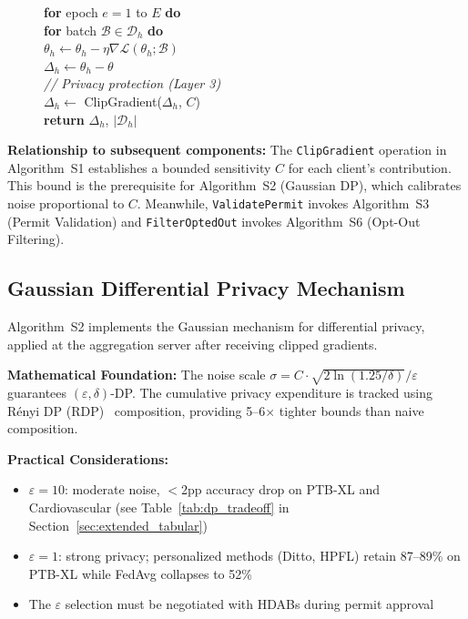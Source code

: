 \documentclass[conference]{IEEEtran}
\begin{document}
\begin{figure}[htbp]
{{\hspace*{4mm}\textbf{for} epoch $e = 1$ to $E$ \textbf{do}\\
\hspace*{8mm}\textbf{for} batch $\mathcal{B} \in \mathcal{D}_h$ \textbf{do}\\
\hspace*{12mm}$\theta_h \leftarrow \theta_h - \eta \nabla \mathcal{L}(\theta_h; \mathcal{B})$\\
\hspace*{4mm}$\Delta_h \leftarrow \theta_h - \theta$\\
\hspace*{4mm}\textit{// Privacy protection (Layer 3)}\\
\hspace*{4mm}$\Delta_h \leftarrow$ ClipGradient($\Delta_h$, $C$)\\
\hspace*{4mm}\textbf{return} $\Delta_h$, $|\mathcal{D}_h|$
}}
\end{figure}

\textbf{Relationship to subsequent components:} The \texttt{ClipGradient} operation in Algorithm~S1 establishes a bounded sensitivity $C$ for each client's contribution. This bound is the prerequisite for Algorithm~S2 (Gaussian DP), which calibrates noise proportional to $C$. Meanwhile, \texttt{ValidatePermit} invokes Algorithm~S3 (Permit Validation) and \texttt{FilterOptedOut} invokes Algorithm~S6 (Opt-Out Filtering).

\subsection{Gaussian Differential Privacy Mechanism}

Algorithm~S2 implements the Gaussian mechanism for differential privacy, applied at the aggregation server after receiving clipped gradients.

\textbf{Mathematical Foundation:} The noise scale $\sigma = C \cdot \sqrt{2\ln(1.25/\delta)}/\varepsilon$ guarantees $(\varepsilon, \delta)$-DP. The cumulative privacy expenditure is tracked using R\'enyi DP (RDP)~\cite{mironov2017renyi} composition, providing 5--6$\times$ tighter bounds than naive composition.

\textbf{Practical Considerations:}
\begin{itemize}
    \item $\varepsilon = 10$: moderate noise, $<$2pp accuracy drop on PTB-XL and Cardiovascular (see Table~\ref{tab:dp_tradeoff} in Section~\ref{sec:extended_tabular})
    \item $\varepsilon = 1$: strong privacy; personalized methods (Ditto, HPFL) retain 87--89\% on PTB-XL while FedAvg collapses to 52\%
    \item The $\varepsilon$ selection must be negotiated with HDABs during permit approval
\end{itemize}
\end{document}
